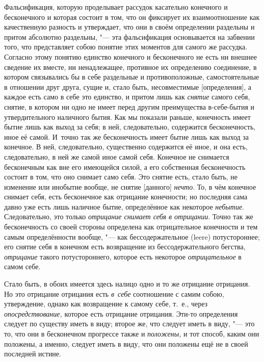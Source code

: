 Фальсификация, которую проделывает рассудок касательно конечного и
бесконечного и которая состоит в том, что он фиксирует их взаимоотношение
как качественную разность и утверждает, что они в своём определении
раздельны и притом абсолютно раздельны, "--- эта фальсификация основывается на
забвении того, что представляет собою понятие этих моментов для самого же
рассудка. Согласно этому понятию единство конечного и бесконечного не есть
ни внешнее сведение их вместе, ни ненадлежащее, противное их определению
соединение, в котором связывались бы в себе раздельные и противоположные,
самостоятельные в отношении друг друга, сущие и, стало быть, несовместимые
[определения], а каждое есть само в себе это единство, и притом лишь как
{\em снятие} самого себя, снятие, в котором ни одно не
имеет перед другим преимущества в-себе-бытия и утвердительного наличного
бытия. Как мы показали раньше, конечность имеет бытие лишь как выход за
себя; в ней, следовательно, содержится бесконечность, иное её самой.
И~точно так же бесконечность имеет бытие лишь как выход за конечное. В ней,
следовательно, существенно содержится её иное, и она есть, следовательно,
в ней же самой иное самой себя. Конечное не снимается бесконечным как вне
его имеющейся силой, а его собственная бесконечность состоит в том, что оно
снимает само себя. Это снятие есть, стало быть, не изменение или инобытие
вообще, не снятие [данного] {\em нечто}. То, в чём
конечное снимает себя, есть бесконечное как отрицание конечности; но
последняя сама давно уже есть лишь наличное бытие, определённое как
некоторое {\em небытие}. Следовательно, это только
{\em отрицание снимает себя в отрицании}. Точно так же
бесконечность со своей стороны определена как отрицательное конечности и
тем самым определённости вообще, "--- как бессодержательное (leere)
потустороннее; его снятие себя в конечном есть возвращение из
бессодержательного бегства, {\em отрицание} такого
потустороннего, которое есть некоторое
{\em отрицательное} в самом себе.

Стало быть, в обоих имеется здесь налицо одно и то же отрицание отрицания.
Но это отрицание отрицания есть {\em в~себе}
соотношение с самим собою, утверждение, однако как возвращение к самому
себе, т.~е., через {\em опосредствование,} которое есть
отрицание отрицания. Эти-то определения следует по существу иметь в виду;
второе же, что следует иметь в виду, "--- это то, что они в бесконечном
прогрессе также и {\em положены,} и тот способ, каким
они положены, а именно, следует иметь в виду, что они положены ещё не в
своей последней истине.

